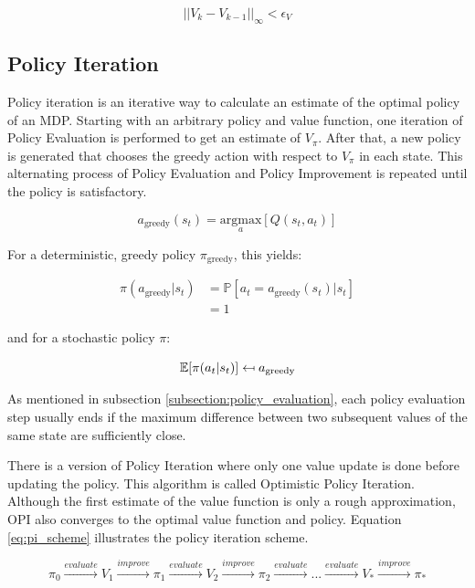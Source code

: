 \begin{equation}
||V_{k}-V_{k-1}||_\infty<\epsilon_V
\label{eq:pe_stopping_criterion}
\end{equation}

\subsection{Policy Iteration}
\label{sec:PI}
Policy iteration is an iterative way to calculate an estimate of the optimal policy of an MDP. Starting with an arbitrary policy and value function, one iteration of Policy Evaluation is performed to get an estimate of $V_\pi$. After that, a new policy is generated that chooses the greedy action with respect to $V_\pi$ in each state. This alternating process of Policy Evaluation and Policy Improvement is repeated until the policy is satisfactory.

\begin{equation}
a_{\text{greedy}}(s_t) = \underset{a}{\text{argmax}}[Q(s_t,a_t)]
\end{equation}

For a deterministic, greedy policy $\pi_{\text{greedy}}$, this yields:

\begin{align}
\pi(a_{\text{greedy}}|s_t)&=\mathbb{P}[a_t=a_{\text{greedy}}(s_t)|s_t] \\ &=1
\end{align}

and for a stochastic policy $\pi$:

\begin{equation}
\mathbb{E}[\pi(a_t | s_t)] \mathrel{\reflectbox{\ensuremath{\mapsto}}} a_{\text{greedy}}
\end{equation}

As mentioned in subsection \ref{subsection:policy_evaluation}, each policy evaluation step usually ends if the maximum difference between two subsequent values of the same state are sufficiently close.

There is a version of Policy Iteration where only one value update is done before updating the policy. This algorithm is called Optimistic Policy Iteration. Although the first estimate of the value function is only a rough approximation, OPI also converges to the optimal value function and policy. Equation \ref{eq:pi_scheme} illustrates the policy iteration scheme.

\begin{equation*}
\pi_0 \overset{evaluate}{\longrightarrow} V_1 \overset{improve}{\longrightarrow} \pi_1 \overset{evaluate}{\longrightarrow} V_2 \overset{improve}{\longrightarrow} \pi_2 \overset{evaluate}{\longrightarrow} ... \overset{evaluate}{\longrightarrow} V_* \overset{improve}{\longrightarrow} \pi_*
\label{eq:pi_scheme}
\end{equation*}

